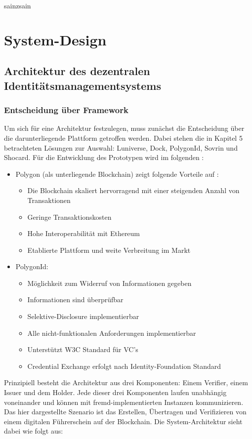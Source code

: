 sainzsain\chapter{System-Design}
\label{cha:systemdesign}

\section{Architektur des dezentralen Identitätsmanagementsystems}

\subsection{Entscheidung über Framework}
Um sich für eine Architektur festzulegen, muss zunächst die Entscheidung über die darunterliegende Plattform getroffen werden. Dabei stehen die in Kapitel 5 betrachteten Lösungen zur Auswahl: Luniverse, Dock, PolygonId, Sovrin und Shocard. Für die Entwicklung des Prototypen wird im folgenden :
\begin{itemize}
	
	\item Polygon (als unterliegende Blockchain) zeigt folgende Vorteile auf \cite{ID54}:
	\begin{itemize}
		\item Die Blockchain skaliert hervorragend mit einer steigenden Anzahl von Transaktionen
		\item Geringe Transaktionskosten
		\item Hohe Interoperabilität mit Ethereum
		\item Etablierte Plattform und weite Verbreitung im Markt
	\end{itemize}
	
	\item PolygonId:
	\begin{itemize}
		\item Möglichkeit zum Widerruf von Informationen gegeben
		\item Informationen sind überprüfbar
		\item Selektive-Disclosure implementierbar
		\item Alle nicht-funktionalen Anforderungen implementierbar
		\item Unterstützt W3C Standard für VC's
		\item Credential Exchange erfolgt nach Identity-Foundation Standard
	\end{itemize}
\end{itemize}
Prinzipiell besteht die Architektur aus drei Komponenten: Einem Verifier, einem Issuer und dem Holder. Jede dieser drei Komponenten laufen unabhängig voneinander und können mit fremd-implementierten Instanzen kommunizieren. Das hier dargestellte Szenario ist das Erstellen, Übertragen und Verifizieren von einem digitalen Führerschein auf der Blockchain. Die System-Architektur sieht dabei wie folgt aus:
